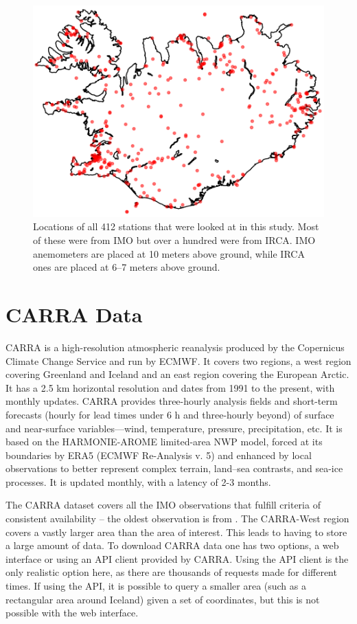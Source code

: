 \begin{figure}
    \centering
    \includegraphics[scale = 1]{Figures/stationsOverIceland_2024-05-16_stripped_to_frame.png}
    \caption[Locations of automatic weather stations in Iceland]{Locations of all 412 stations that were looked at in this study. Most of these were from IMO but over a hundred were from IRCA. IMO anemometers are placed at 10 meters above ground, while IRCA ones are placed at 6--7 meters above ground.}
    \label{fig:aws_map}
\end{figure}

\section{CARRA Data}
CARRA is a high-resolution atmospheric reanalysis produced by the Copernicus Climate Change Service and run by ECMWF. It covers two regions, a west region covering Greenland and Iceland and an east region covering the European Arctic. It has a 2.5 km horizontal resolution and dates from 1991 to the present, with monthly updates. CARRA provides three-hourly analysis fields and short-term forecasts (hourly for lead times under 6 h and three-hourly beyond) of surface and near-surface variables—wind, temperature, pressure, precipitation, etc. It is based on the HARMONIE-AROME limited-area NWP model, forced at its boundaries by ERA5 (ECMWF Re-Analysis v. 5) and enhanced by local observations to better represent complex terrain, land–sea contrasts, and sea-ice processes. It is updated monthly, with a latency of 2-3 months\cite{carra_information}.

The CARRA dataset covers all the IMO observations that fulfill criteria of consistent availability – the oldest observation is from \startDateVedur. The CARRA-West region covers a vastly larger area than the area of interest. This leads to having to store a large amount of data. To download CARRA data one has two options, a web interface or using an API client provided by CARRA. Using the API client is the only realistic option here, as there are thousands of requests made for different times. If using the API, it is possible to query a smaller area (such as a rectangular area around Iceland) given a set of coordinates, but this is not possible with the web interface.

